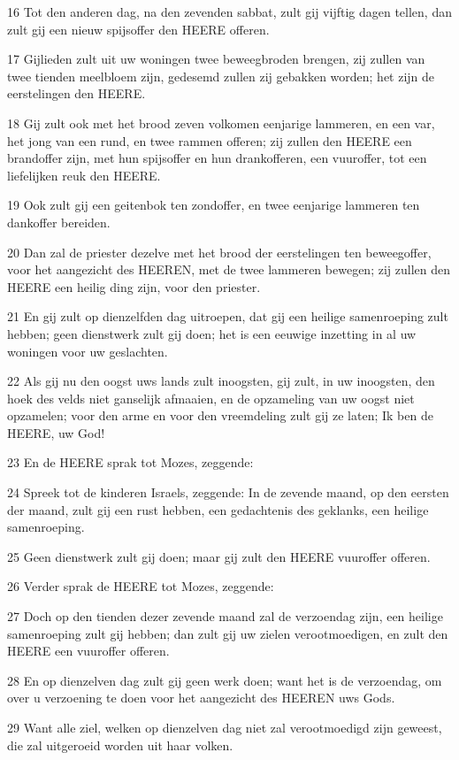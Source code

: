 \par 16 Tot den anderen dag, na den zevenden sabbat, zult gij vijftig dagen tellen, dan zult gij een nieuw spijsoffer den HEERE offeren.
\par 17 Gijlieden zult uit uw woningen twee beweegbroden brengen, zij zullen van twee tienden meelbloem zijn, gedesemd zullen zij gebakken worden; het zijn de eerstelingen den HEERE.
\par 18 Gij zult ook met het brood zeven volkomen eenjarige lammeren, en een var, het jong van een rund, en twee rammen offeren; zij zullen den HEERE een brandoffer zijn, met hun spijsoffer en hun drankofferen, een vuuroffer, tot een liefelijken reuk den HEERE.
\par 19 Ook zult gij een geitenbok ten zondoffer, en twee eenjarige lammeren ten dankoffer bereiden.
\par 20 Dan zal de priester dezelve met het brood der eerstelingen ten beweegoffer, voor het aangezicht des HEEREN, met de twee lammeren bewegen; zij zullen den HEERE een heilig ding zijn, voor den priester.
\par 21 En gij zult op dienzelfden dag uitroepen, dat gij een heilige samenroeping zult hebben; geen dienstwerk zult gij doen; het is een eeuwige inzetting in al uw woningen voor uw geslachten.
\par 22 Als gij nu den oogst uws lands zult inoogsten, gij zult, in uw inoogsten, den hoek des velds niet ganselijk afmaaien, en de opzameling van uw oogst niet opzamelen; voor den arme en voor den vreemdeling zult gij ze laten; Ik ben de HEERE, uw God!
\par 23 En de HEERE sprak tot Mozes, zeggende:
\par 24 Spreek tot de kinderen Israels, zeggende: In de zevende maand, op den eersten der maand, zult gij een rust hebben, een gedachtenis des geklanks, een heilige samenroeping.
\par 25 Geen dienstwerk zult gij doen; maar gij zult den HEERE vuuroffer offeren.
\par 26 Verder sprak de HEERE tot Mozes, zeggende:
\par 27 Doch op den tienden dezer zevende maand zal de verzoendag zijn, een heilige samenroeping zult gij hebben; dan zult gij uw zielen verootmoedigen, en zult den HEERE een vuuroffer offeren.
\par 28 En op dienzelven dag zult gij geen werk doen; want het is de verzoendag, om over u verzoening te doen voor het aangezicht des HEEREN uws Gods.
\par 29 Want alle ziel, welken op dienzelven dag niet zal verootmoedigd zijn geweest, die zal uitgeroeid worden uit haar volken.
